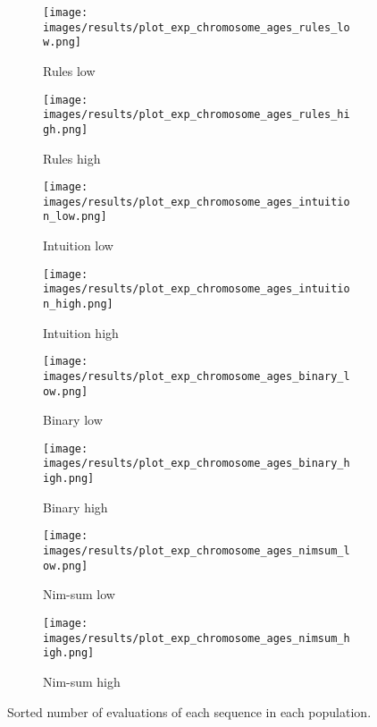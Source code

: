 \begin{landscape}
\begin{figure}[ht]
	\begin{subfigure}{0.24\linewidth}
	\centering
	\texttt{[image: images/results/plot\_exp\_chromosome\_ages\_rules\_low.png]}
	\caption{Rules low}
	\label{fig:exp_age_rules_low}
	\end{subfigure}
	\hfill
	\begin{subfigure}{0.24\linewidth}
	\centering
	\texttt{[image: images/results/plot\_exp\_chromosome\_ages\_rules\_high.png]}
	\caption{Rules high}
	\label{fig:exp_age_rules_high}
	\end{subfigure}
	\begin{subfigure}{0.24\linewidth}
	\centering
	\texttt{[image: images/results/plot\_exp\_chromosome\_ages\_intuition\_low.png]}
	\caption{Intuition low}
	\label{fig:exp_age_intuition_low}
	\end{subfigure}
	\hfill
	\begin{subfigure}{0.24\linewidth}
	\centering
	\texttt{[image: images/results/plot\_exp\_chromosome\_ages\_intuition\_high.png]}
	\caption{Intuition high}
	\label{fig:exp_age_intuition_high}
	\end{subfigure}
	\begin{subfigure}{0.24\linewidth}
	\centering
	\texttt{[image: images/results/plot\_exp\_chromosome\_ages\_binary\_low.png]}
	\caption{Binary low}
	\label{fig:exp_age_binary_low}
	\end{subfigure}
	\hfill
	\begin{subfigure}{0.24\linewidth}
	\centering
	\texttt{[image: images/results/plot\_exp\_chromosome\_ages\_binary\_high.png]}
	\caption{Binary high}
	\label{fig:exp_age_binary_high}
	\end{subfigure}
	\begin{subfigure}{0.24\linewidth}
	\centering
	\texttt{[image: images/results/plot\_exp\_chromosome\_ages\_nimsum\_low.png]}
	\caption{Nim-sum low}
	\label{fig:exp_age_nimsum_low}
	\end{subfigure}
	\hfill
	\begin{subfigure}{0.24\linewidth}
	\centering
	\texttt{[image: images/results/plot\_exp\_chromosome\_ages\_nimsum\_high.png]}
	\caption{Nim-sum high}
	\label{fig:exp_age_nimsum_high}
	\end{subfigure}
	\caption[Sorted number of evaluations]{Sorted number of evaluations of each
	sequence in each population.}
	\label{fig:exp_ages1}
\end{figure}
\end{landscape}

